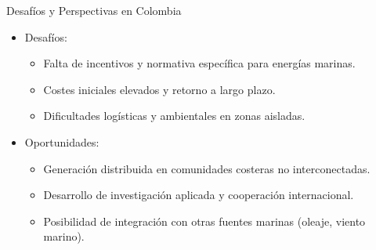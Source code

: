\documentclass[main.tex]{subfiles}
\begin{document}
\begin{frame}{Desafíos y Perspectivas en Colombia}
    \begin{itemize}
        \item Desafíos:
        \begin{itemize}
            \item Falta de incentivos y normativa específica para energías marinas.
            \item Costes iniciales elevados y retorno a largo plazo.
            \item Dificultades logísticas y ambientales en zonas aisladas.
        \end{itemize}
        \item Oportunidades:
        \begin{itemize}
            \item Generación distribuida en comunidades costeras no interconectadas.
            \item Desarrollo de investigación aplicada y cooperación internacional.
            \item Posibilidad de integración con otras fuentes marinas (oleaje, viento marino).
        \end{itemize}
    \end{itemize}
\end{frame}
\end{document}
